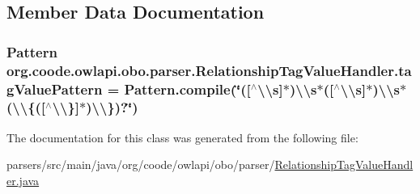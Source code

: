 \subsection{Member Data Documentation}
\hypertarget{classorg_1_1coode_1_1owlapi_1_1obo_1_1parser_1_1_relationship_tag_value_handler_a5e2dafcc9518a6b68c818c318dcacf65}{
\subsubsection[{tag\-Value\-Pattern}]{\setlength{\rightskip}{0pt plus 5cm}Pattern org.\-coode.\-owlapi.\-obo.\-parser.\-Relationship\-Tag\-Value\-Handler.\-tag\-Value\-Pattern = Pattern.\-compile(\char`\"{}(\mbox{[}$^\wedge$\textbackslash{}\textbackslash{}s\mbox{]}$\ast$)\textbackslash{}\textbackslash{}s$\ast$(\mbox{[}$^\wedge$\textbackslash{}\textbackslash{}s\mbox{]}$\ast$)\textbackslash{}\textbackslash{}s$\ast$(\textbackslash{}\textbackslash{}\{(\mbox{[}$^\wedge$\textbackslash{}\textbackslash{}\}\mbox{]}$\ast$)\textbackslash{}\textbackslash{}\})?\char`\"{})\hspace{0.3cm}{\ttfamily [private]}}}\label{classorg_1_1coode_1_1owlapi_1_1obo_1_1parser_1_1_relationship_tag_value_handler_a5e2dafcc9518a6b68c818c318dcacf65}


The documentation for this class was generated from the following file\-:\begin{DoxyCompactItemize}
\item 
parsers/src/main/java/org/coode/owlapi/obo/parser/\hyperlink{_relationship_tag_value_handler_8java}{Relationship\-Tag\-Value\-Handler.\-java}\end{DoxyCompactItemize}
